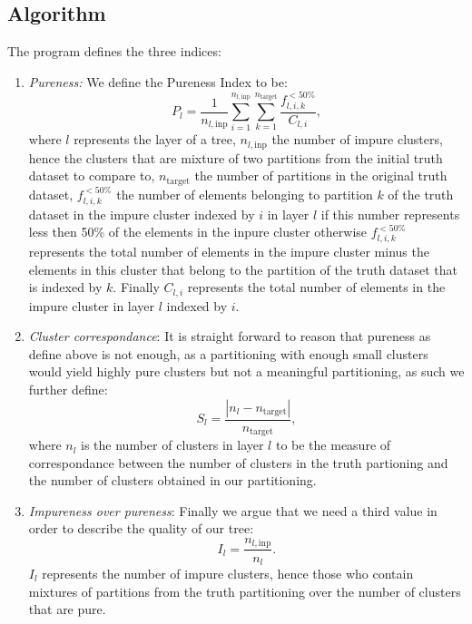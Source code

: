 \subsection{Algorithm}
The program defines the three indices:
\begin{enumerate}
\item \emph{Pureness:} We define the Pureness Index to be:
  \begin{equation}
    P_{l} =
    \frac{1}{n_{l,\mathrm{inp}}}
    \sum_{i=1}^{n_{l,\mathrm{inp}}}\sum_{k=1}^{n_{\mathrm{target}}}
    \frac{f_{l,i,k}^{<50\%}}{C_{l,i}},
    \label{eqn-pureness}
  \end{equation}
  where $l$ represents the layer of a tree, $n_{l,\mathrm{inp}}$ the
  number of impure clusters, hence the clusters that are mixture of
  two partitions from the initial truth dataset to compare to,
  $n_{\mathrm{target}}$ the number of partitions in the original
  truth dataset, $f_{l,i,k}^{<50\%}$ the number of elements
  belonging to partition $k$ of the truth dataset in the impure
  cluster indexed by $i$ in layer $l$ if this number represents less
  then 50\% of the elements in the inpure cluster otherwise
  $f_{l,i,k}^{<50\%}$ represents the total number of elements in the
  impure cluster minus the elements in this cluster that belong to
  the partition of the truth dataset that is indexed by $k$. Finally
  $C_{l,i}$ represents the total number of elements in the impure
  cluster in layer $l$ indexed by $i$.
\item \emph{Cluster correspondance}: It is straight forward to
  reason that pureness as define above is not enough, as a
  partitioning with enough small clusters would yield highly pure
  clusters but not a meaningful partitioning, as such we further
  define:
  \begin{equation}
    S_{l}=\frac{|n_{l}-n_{\mathrm{target}}|}{n_{\mathrm{target}}}, \label{eqn-c-corr}
  \end{equation}
  where $n_{l}$ is the number of clusters in layer $l$ to be the
  measure of correspondance between the number of clusters in the
  truth partioning and the number of clusters obtained in our
  partitioning.
\item \emph{Impureness over pureness}: Finally we argue that we need a
  third value in order to describe the quality of our tree:
  \begin{equation}
    I_{l}=\frac{n_{l,\mathrm{inp}}}{n_{l}}. \label{eqn-impure-pure}
  \end{equation}
  $I_{l}$ represents the number of impure clusters, hence those who
  contain mixtures of partitions from the truth partitioning over
  the number of clusters that are pure.
\end{enumerate}
